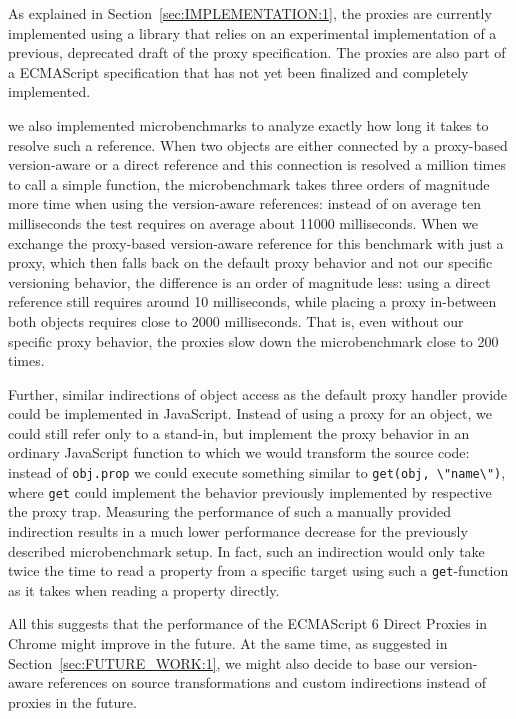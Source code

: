 As explained in Section~\ref{sec:IMPLEMENTATION:1}, the proxies are currently implemented using a library that relies on an experimental implementation of a previous, deprecated draft of the proxy specification.
The proxies are also part of a ECMAScript specification that has not yet been finalized and completely implemented.


 we also implemented microbenchmarks to analyze exactly how long it takes to resolve such a reference.
When two objects are either connected by a proxy-based version-aware or a direct reference and this connection is resolved a million times to call a simple function, the microbenchmark takes three orders of magnitude more time when using the version-aware references: instead of on average ten milliseconds the test requires on average about 11000 milliseconds.
When we exchange the proxy-based version-aware reference for this benchmark with just a proxy, which then falls back on the default proxy behavior and not our specific versioning behavior, the difference is an order of magnitude less: using a direct reference still requires around 10 milliseconds, while placing a proxy in-between both objects requires close to 2000 milliseconds.
That is, even without our specific proxy behavior, the proxies slow down the microbenchmark close to 200 times.






Further, similar indirections of object access as the default proxy handler provide could be implemented in JavaScript.
Instead of using a proxy for an object, we could still refer only to a stand-in, but implement the proxy behavior in an ordinary JavaScript function to which we would transform the source code: instead of \lstinline{obj.prop} we could execute something similar to \lstinline{get(obj, \"name\")}, where \lstinline{get} could implement the behavior previously implemented by respective the proxy trap.
Measuring the performance of such a manually provided indirection results in a much lower performance decrease for the previously described microbenchmark setup.
In fact, such an indirection would only take twice the time to read a property from a specific target using such a \lstinline{get}-function as it takes when reading a property directly. 


All this suggests that the performance of the ECMAScript 6 Direct Proxies in Chrome might improve in the future.
At the same time, as suggested in Section~\ref{sec:FUTURE_WORK:1}, we might also decide to base our version-aware references on source transformations and custom indirections instead of proxies in the future.
